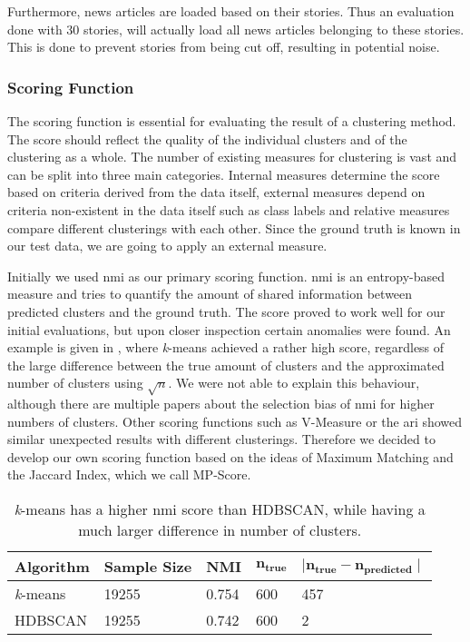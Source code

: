 Furthermore, news articles are loaded based on their stories. 
Thus an evaluation done with 30 stories, will actually load all news articles belonging to these stories.
This is done to prevent stories from being cut off, resulting in potential noise.

\subsubsection{Scoring Function}
\label{subsubsec:4b_scoring_function}

The scoring function is essential for evaluating the result of a clustering method.
The score should reflect the quality of the individual clusters and of the clustering as a whole.
The number of existing measures for clustering is vast and can be split into three main categories.
Internal measures determine the score based on criteria derived from the data itself,
 external measures depend on criteria non-existent in the data itself such as class labels
 and relative measures compare different clusterings with each other.
Since the ground truth is known in our test data, we are going to apply an external measure.

Initially we used \gls{nmi} as our primary scoring function.
\gls{nmi} is an entropy-based measure and tries to quantify the amount of shared information between predicted clusters and the ground truth.
The score proved to work well for our initial evaluations, but upon closer inspection certain anomalies were found.
An example is given in , where \textit{k}-means achieved a rather high score,
regardless of the large difference between the true amount of clusters and the approximated number of clusters using $\sqrt{n}$.
We were not able to explain this behaviour, although there are multiple papers
about the selection bias of \gls{nmi} for higher numbers of clusters\cite{LEI201758, clustering_anmi}.
Other scoring functions such as V-Measure or the \gls{ari} showed similar unexpected results with different clusterings.
Therefore we decided to develop our own scoring function based on the ideas of Maximum Matching\cite{data_mining}
and the Jaccard Index, which we call MP-Score.

\begin{table}[h]
    \centering
    \begin{tabular}{|l|l|l|l|l|}
    \hline
    \textbf{Algorithm} & \textbf{Sample Size} & \textbf{NMI}  & $\mathbf{n_{true}}$ & $\mathbf{ \mid n_{true} - n_{predicted} \mid }$ \\ \hline
    \textit{k}-means & 19255 & 0.754 & 600 & 457 \\ \hline
    HDBSCAN & 19255 & 0.742 & 600 & 2 \\ \hline
    \end{tabular}
    \caption{
        \textit{k}-means has a higher \gls{nmi} score than HDBSCAN,
        while having a much larger difference in number of clusters.
    }
    \label{tab:nmi_kmeans_example}
\end{table}

